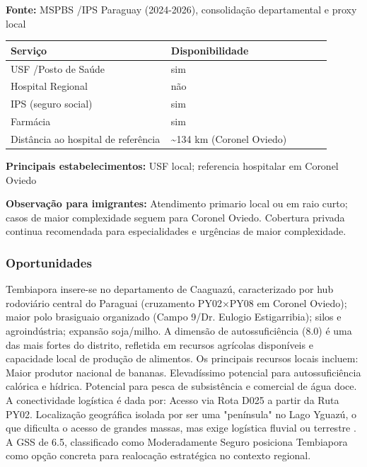 \textbf{Fonte:} MSPBS /\allowbreak  IPS Paraguay (2024-2026), consolidação
departamental e proxy local

{\def\LTcaptype{none} %
\begin{longtable}{@{}>{\raggedright\arraybackslash}p{0.45\linewidth} >{\raggedright\arraybackslash}p{0.45\linewidth}@{}}
\toprule\noalign{}
Serviço & Disponibilidade \\
\midrule\noalign{}
\endhead
\bottomrule\noalign{}
\endlastfoot
USF /\allowbreak  Posto de Saúde & sim \\
Hospital Regional & não \\
IPS (seguro social) & sim \\
Farmácia & sim \\
Distância ao hospital de referência & \textasciitilde134 km (Coronel
Oviedo) \\
\end{longtable}
}

\textbf{Principais estabelecimentos:} USF local; referencia hospitalar
em Coronel Oviedo

\textbf{Observação para imigrantes:} Atendimento primario local ou em
raio curto; casos de maior complexidade seguem para Coronel Oviedo.
Cobertura privada continua recomendada para especialidades e urgências
de maior complexidade.
\newpage

\subsubsection*{Oportunidades}\label{oport-tembiapora-0521}
Tembiapora insere-se no departamento de Caaguazú, caracterizado por hub rodoviário central do Paraguai (cruzamento PY02×PY08 em Coronel Oviedo); maior polo brasiguaio organizado (Campo 9/Dr. Eulogio Estigarribia); silos e agroindústria; expansão soja/milho. A dimensão de autossuficiência (8.0) é uma das mais fortes do distrito, refletida em recursos agrícolas disponíveis e capacidade local de produção de alimentos. Os principais recursos locais incluem: Maior produtor nacional de bananas. Elevadíssimo potencial para autossuficiência calórica e hídrica. Potencial para pesca de subsistência e comercial de água doce. A conectividade logística é dada por: Acesso via Rota D025 a partir da Ruta PY02. Localização geográfica isolada por ser uma "península" no Lago Yguazú, o que dificulta o acesso de grandes massas, mas exige logística fluvial ou terrestre . A GSS de 6.5, classificado como Moderadamente Seguro posiciona Tembiapora como opção concreta para realocação estratégica no contexto regional.

